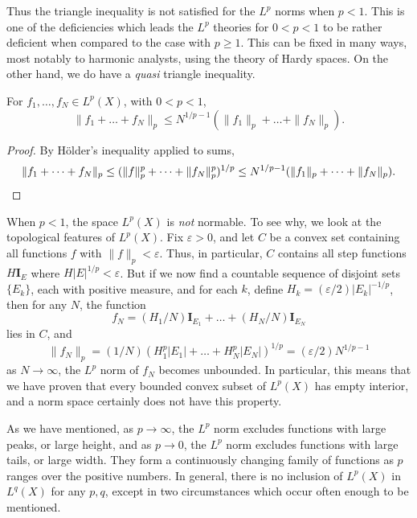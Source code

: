Thus the triangle inequality is not satisfied for the $L^p$ norms when $p < 1$. This is one of the deficiencies which leads the $L^p$ theories for $0 < p < 1$ to be rather deficient when compared to the case with $p \geq 1$. This can be fixed in many ways, most notably to harmonic analysts, using the theory of Hardy spaces. On the other hand, we do have a \emph{quasi} triangle inequality.

\begin{theorem}
    For $f_1, \dots, f_N \in L^p(X)$, with $0 < p < 1$,
    \[ \| f_1 + \dots + f_N \|_p \leq N^{1/p - 1} (\| f_1 \|_p + \dots + \| f_N \|_p). \]
\end{theorem}
\begin{proof}
    By H\"{o}lder's inequality applied to sums,
    \[ \| f_1 + \dots + f_N \|_p \leq (\| f \|_p^p + \dots + \| f_N \|_p^p)^{1/p} \leq N^{1/p - 1} (\| f_1 \|_p + \dots + \| f_N \|_p). \qedhere \]
\end{proof}

\begin{remark}
    When $p < 1$, the space $L^p(X)$ is \emph{not} normable. To see why, we look at the topological features of $L^p(X)$. Fix $\varepsilon > 0$, and let $C$ be a convex set containing all functions $f$ with $\| f \|_p < \varepsilon$. Thus, in particular, $C$ contains all step functions $H \mathbf{I}_E$ where $H |E|^{1/p} < \varepsilon$. But if we now find a countable sequence of disjoint sets $\{ E_k \}$, each with positive measure, and for each $k$, define $H_k = (\varepsilon/2) |E_k|^{-1/p}$, then for any $N$, the function
    \[ f_N = (H_1/N) \mathbf{I}_{E_1} + \dots + (H_N/N) \mathbf{I}_{E_N} \]
    lies in $C$, and
    \[ \| f_N \|_p = (1/N) (H_1^p |E_1| + \dots + H_N^p |E_N|)^{1/p} = (\varepsilon/2) N^{1/p - 1} \]
    as $N \to \infty$, the $L^p$ norm of $f_N$ becomes unbounded. In particular, this means that we have proven that every bounded convex subset of $L^p(X)$ has empty interior, and a norm space certainly does not have this property.
\end{remark}

As we have mentioned, as $p \to \infty$, the $L^p$ norm excludes functions with large peaks, or large height, and as $p \to 0$, the $L^p$ norm excludes functions with large tails, or large width. They form a continuously changing family of functions as $p$ ranges over the positive numbers. In general, there is no inclusion of $L^p(X)$ in $L^q(X)$ for any $p,q$, except in two circumstances which occur often enough to be mentioned.

